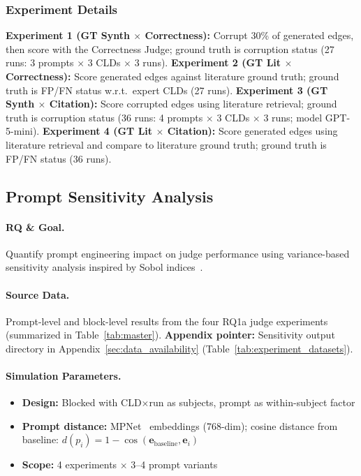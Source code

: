 \subsubsection{Experiment Details}

\noindent\textbf{Experiment 1 (GT Synth $\times$ Correctness):} Corrupt 30\% of generated edges, then score with the Correctness Judge; ground truth is corruption status (27 runs: 3 prompts $\times$ 3 CLDs $\times$ 3 runs). \textbf{Experiment 2 (GT Lit $\times$ Correctness):} Score generated edges against literature ground truth; ground truth is FP/FN status w.r.t.\ expert CLDs (27 runs). \textbf{Experiment 3 (GT Synth $\times$ Citation):} Score corrupted edges using literature retrieval; ground truth is corruption status (36 runs: 4 prompts $\times$ 3 CLDs $\times$ 3 runs; model GPT-5-mini). \textbf{Experiment 4 (GT Lit $\times$ Citation):} Score generated edges using literature retrieval and compare to literature ground truth; ground truth is FP/FN status (36 runs).

\subsection{Prompt Sensitivity Analysis}
\label{sec:rq1a_sensitivity}

\paragraph{RQ \& Goal.}
Quantify prompt engineering impact on judge performance using variance-based sensitivity analysis inspired by Sobol indices~\cite{sobol1993sensitivity}.

\paragraph{Source Data.}
Prompt-level and block-level results from the four RQ1a judge experiments (summarized in Table~\ref{tab:master}).
\textbf{Appendix pointer:} Sensitivity output directory in Appendix~\ref{sec:data_availability} (Table~\ref{tab:experiment_datasets}).

\paragraph{Simulation Parameters.}
\begin{itemize}[noitemsep]
    \item \textbf{Design:} Blocked with CLD$\times$run as subjects, prompt as within-subject factor
    \item \textbf{Prompt distance:} MPNet~\cite{song2020mpnet} embeddings (768-dim); cosine distance from baseline: $d(p_i) = 1 - \cos(\mathbf{e}_{\text{baseline}}, \mathbf{e}_i)$
    \item \textbf{Scope:} 4 experiments $\times$ 3--4 prompt variants
\end{itemize}

